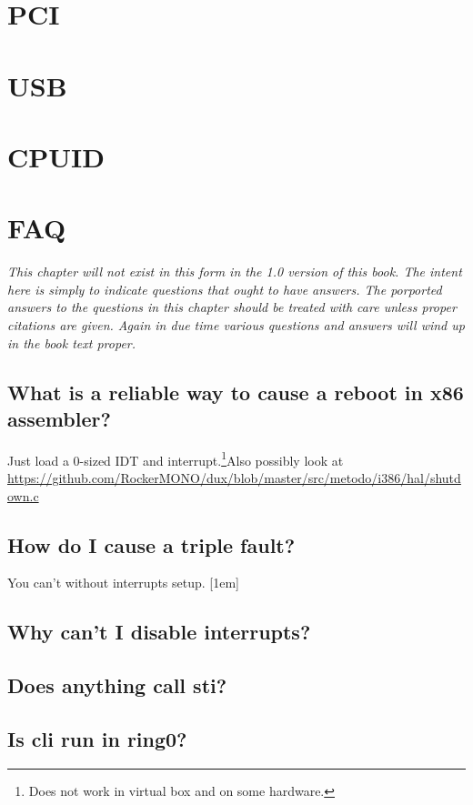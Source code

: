 \documentclass[oneside,english,final]{amsbook}
\newcommand\cn{{\small{\ap{\textbf{[\textit{citation-needed}]}}}}}
\begin{document}
\chapter{PCI}
\chapter{USB}
\chapter{CPUID}

\chapter{FAQ} {\small\textit{This chapter will not exist in this form in
    the 1.0 version of this book. The intent here is simply to indicate
    questions that ought to have answers. The porported
    answers to the questions in this chapter should be treated with care
    unless proper citations are given. Again in due time various questions
    and answers will wind up in the book text proper.}}
\section{What is a reliable way to cause a reboot in x86 assembler?}

Just load a 0-sized IDT and interrupt.\footnote{Does not work in virtual
  box and on some hardware.}\cn Also possibly look at
\url{https://github.com/RockerMONO/dux/blob/master/src/metodo/i386/hal/shutdown.c}


\section{How do I cause a triple fault?}

You can't without interrupts setup.  [1em]

\section{Why can't I disable interrupts?}

\section{Does anything call sti?}

\section{Is cli run in ring0?}
\end{document}
